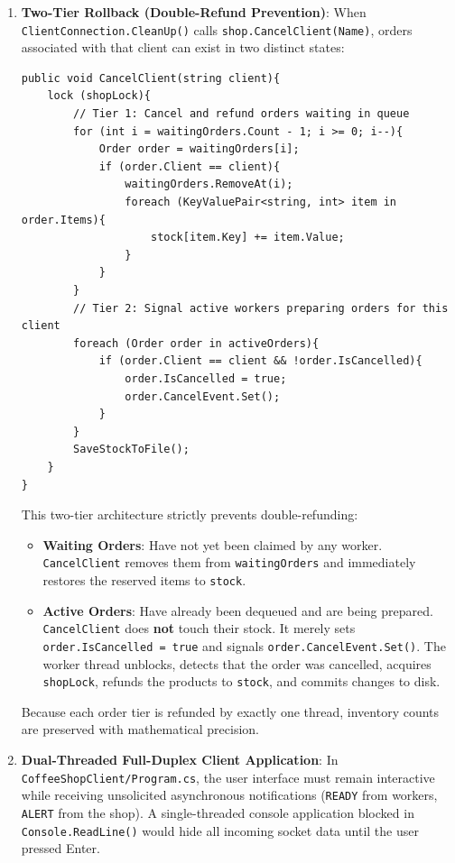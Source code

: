 \documentclass[11pt,a4paper]{article}
\begin{document}
\begin{enumerate}
    \item \textbf{Two-Tier Rollback (Double-Refund Prevention)}:
    When \texttt{ClientConnection.CleanUp()} calls \texttt{shop.CancelClient(Name)}, orders associated with that client can exist in two distinct states:
    \begin{lstlisting}[language={[Sharp]C}]
public void CancelClient(string client){
    lock (shopLock){
        // Tier 1: Cancel and refund orders waiting in queue
        for (int i = waitingOrders.Count - 1; i >= 0; i--){
            Order order = waitingOrders[i];
            if (order.Client == client){
                waitingOrders.RemoveAt(i);
                foreach (KeyValuePair<string, int> item in order.Items){
                    stock[item.Key] += item.Value;
                }
            }
        }
        // Tier 2: Signal active workers preparing orders for this client
        foreach (Order order in activeOrders){
            if (order.Client == client && !order.IsCancelled){
                order.IsCancelled = true;
                order.CancelEvent.Set();
            }
        }
        SaveStockToFile();
    }
}
    \end{lstlisting}
    This two-tier architecture strictly prevents double-refunding:
    \begin{itemize}
        \item \textbf{Waiting Orders}: Have not yet been claimed by any worker. \texttt{CancelClient} removes them from \texttt{waitingOrders} and immediately restores the reserved items to \texttt{stock}.
        \item \textbf{Active Orders}: Have already been dequeued and are being prepared. \texttt{CancelClient} does \textbf{not} touch their stock. It merely sets \texttt{order.IsCancelled = true} and signals \texttt{order.CancelEvent.Set()}. The worker thread unblocks, detects that the order was cancelled, acquires \texttt{shopLock}, refunds the products to \texttt{stock}, and commits changes to disk.
    \end{itemize}
    Because each order tier is refunded by exactly one thread, inventory counts are preserved with mathematical precision.

    \item \textbf{Dual-Threaded Full-Duplex Client Application}:
    In \texttt{CoffeeShopClient/Program.cs}, the user interface must remain interactive while receiving unsolicited asynchronous notifications (\texttt{READY} from workers, \texttt{ALERT} from the shop). A single-threaded console application blocked in \texttt{Console.ReadLine()} would hide all incoming socket data until the user pressed Enter.
    

\end{enumerate}
\end{document}
